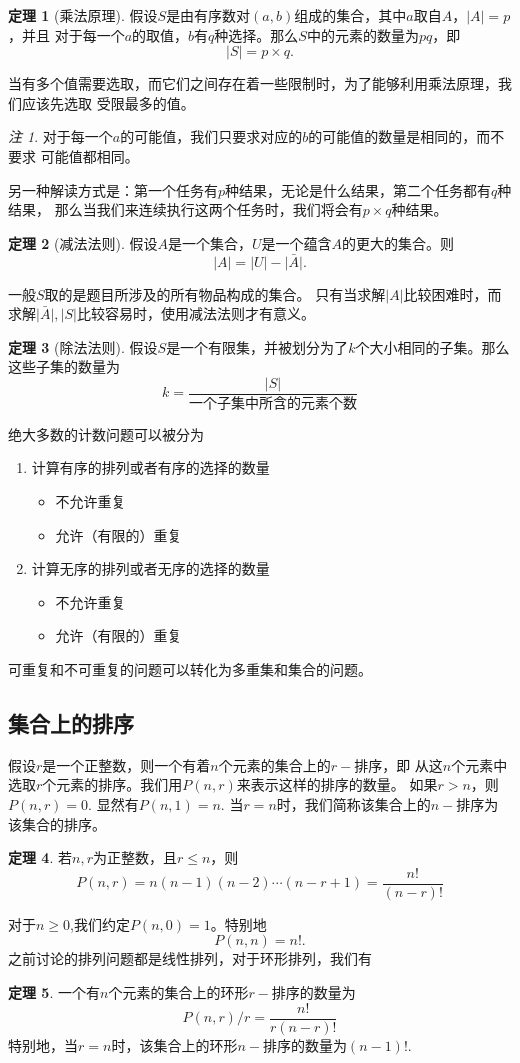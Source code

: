 \documentclass[a4paper,11pt]{article}%
\theoremstyle{remark}
\newtheorem*{remark}{注}
\theoremstyle{remark}
\theoremstyle{definition}
\newtheorem{theorem}{定理}[section]
\theoremstyle{definition}
\theoremstyle{definition}
\newcommand*{\abs}[1]{\lvert #1 \rvert}
\begin{document}
\begin{theorem}[乘法原理]
   假设$S$是由有序数对$(a,b)$组成的集合，其中$a$取自$A$，$\abs{A}=p$，并且
   对于每一个$a$的取值，$b$有$q$种选择。那么$S$中的元素的数量为$pq$，即
   \[\abs{S}=p\times q.\]
\end{theorem}
当有多个值需要选取，而它们之间存在着一些限制时，为了能够利用乘法原理，我们应该先选取
受限最多的值。
\begin{remark}
    对于每一个$a$的可能值，我们只要求对应的$b$的可能值的数量是相同的，而不要求
    可能值都相同。
\end{remark}
另一种解读方式是：第一个任务有$p$种结果，无论是什么结果，第二个任务都有$q$种结果，
那么当我们来连续执行这两个任务时，我们将会有$p\times q$种结果。
\begin{theorem}[减法法则]
   假设$A$是一个集合，$U$是一个蕴含$A$的更大的集合。则 
   \[\abs{A}=\abs{U}-\abs{\bar{A}}.\] 
\end{theorem}
一般$S$取的是题目所涉及的所有物品构成的集合。
只有当求解$\abs{A}$比较困难时，而求解$\abs{\bar{A}},\abs{S}$比较容易时，使用减法法则才有意义。
\begin{theorem}[除法法则]
   假设$S$是一个有限集，并被划分为了$k$个大小相同的子集。那么这些子集的数量为
   \[k= \frac{\abs{S}}{\text{一个子集中所含的元素个数}}\] 
\end{theorem}
绝大多数的计数问题可以被分为
\begin{enumerate}
    \item 计算有序的排列或者有序的选择的数量
    \begin{itemize}
        \item 不允许重复
        \item 允许（有限的）重复
    \end{itemize}
    \item 计算无序的排列或者无序的选择的数量
    \begin{itemize}
        \item 不允许重复
        \item 允许（有限的）重复
    \end{itemize}
\end{enumerate}
可重复和不可重复的问题可以转化为多重集和集合的问题。
\subsection{集合上的排序}
假设$r$是一个正整数，则一个有着$n$个元素的集合上的$r-$排序，即
从这$n$个元素中选取$r$个元素的排序。我们用$P(n,r)$来表示这样的排序的数量。
如果$r>n$，则$P(n,r)=0$. 显然有$P(n,1)=n$. 当$r=n$时，我们简称该集合上的$n-$排序为
该集合的排序。
\begin{theorem}
    若$n,r$为正整数，且$r\leq n$，则
    \[P(n,r)=n(n-1)(n-2)\cdots(n-r+1)=\frac{n!}{(n-r)!}\]
\end{theorem}
对于$n\geq 0$,我们约定$P(n,0)=1$。特别地
\[P(n,n)=n!.\]
之前讨论的排列问题都是线性排列，对于环形排列，我们有
\begin{theorem}
    一个有$n$个元素的集合上的环形$r-$排序的数量为
    \[P(n,r)/r=\frac{n!}{r(n-r)!}\]
    特别地，当$r=n$时，该集合上的环形$n-$排序的数量为$(n-1)!$.
\end{theorem}
\end{document}
